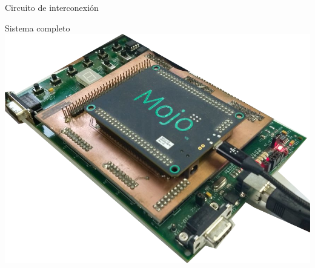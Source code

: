 \documentclass[11pt,a4paper]{beamer}
\begin{document}
\begin{frame}{Circuito de interconexión}
\begin{itemize}
				\end{itemize}
			\end{frame}
			\begin{frame}{Sistema completo}
				\centering
				\includegraphics[width=.6\textwidth]{fisico}
			\end{frame}
\end{document}
